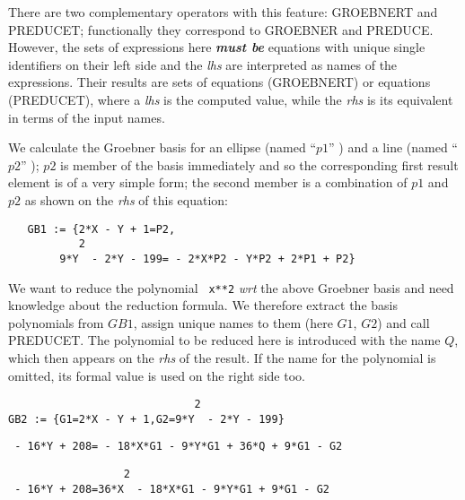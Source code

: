  
There are two complementary operators with this feature: GROEBNERT
and PREDUCET; functionally they correspond to GROEBNER and PREDUCE.
However, the sets of expressions here {\it {\bf must be}} equations
with unique single identifiers on their left side and the {\it lhs} are
interpreted as names of the expressions. Their results are
sets of equations (GROEBNERT) or equations (PREDUCET), where
a {\it lhs} is the computed value, while the {\it rhs} is its equivalent
in terms of the input names.

\example {}

We calculate the Groebner basis for an ellipse (named ``$p1$'' ) and a
line (named ``$p2$'' ); $p2$ is member of the basis immediately and so
the corresponding first result element is of a very simple form; the
second member is a combination of $p1$ and $p2$ as shown on the
{\it rhs} of this equation:

\begin{verbatim}   GB1 := {2*X - Y + 1=P2,
           2
        9*Y  - 2*Y - 199= - 2*X*P2 - Y*P2 + 2*P1 + P2}
\end{verbatim}

\example {}

We want to reduce the polynomial \verb+ x**2+ {\it  wrt}
the above Groebner basis and need knowledge about the reduction
formula. We therefore extract the basis polynomials from $GB1$,
assign unique names to them (here $G1$, $G2$) and call PREDUCET.
The polynomial to be reduced here is introduced with the name $Q$,
which then appears on the {\it rhs} of the result. If the name for the
polynomial is omitted, its formal value is used on the right side too.

\begin{verbatim}
                             2
GB2 := {G1=2*X - Y + 1,G2=9*Y  - 2*Y - 199}
\end{verbatim}

\begin{verbatim}
 - 16*Y + 208= - 18*X*G1 - 9*Y*G1 + 36*Q + 9*G1 - G2
\end{verbatim}

\begin{verbatim}
                  2
 - 16*Y + 208=36*X  - 18*X*G1 - 9*Y*G1 + 9*G1 - G2

\end{verbatim}

